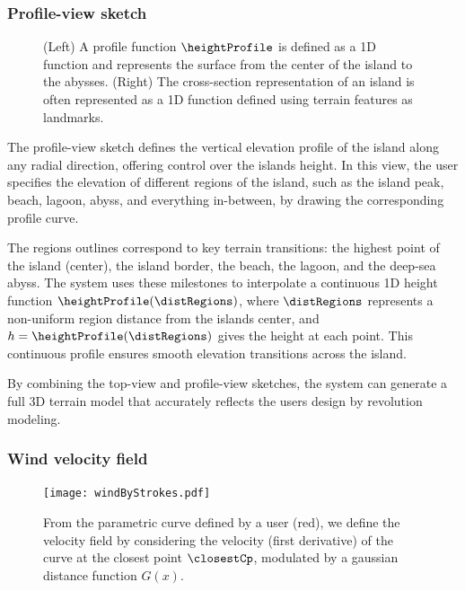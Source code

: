 \subsubsection{Profile-view sketch}

\begin{figure}[H]
	\centering
    \caption{(Left) A profile function $\heightProfile$ is defined as a 1D function and represents the surface from the center of the island to the abysses. (Right) The cross-section representation of an island is often represented as a 1D function defined using terrain features as landmarks. }
    \label{fig:coral-island_profile-function}
\end{figure}

The profile-view sketch defines the vertical elevation profile of the island along any radial direction, offering control over the islands height. In this view, the user specifies the elevation of different regions of the island, such as the island peak, beach, lagoon, abyss, and everything in-between, by drawing the corresponding profile curve.

The regions outlines correspond to key terrain transitions: the highest point of the island (center), the island border, the beach, the lagoon, and the deep-sea abyss. The system uses these milestones to interpolate a continuous 1D height function $\heightProfile(\distRegions)$, where $\distRegions$ represents a non-uniform region distance from the islands center, and $h = \heightProfile(\distRegions)$ gives the height at each point. This continuous profile ensures smooth elevation transitions across the island.

By combining the top-view and profile-view sketches, the system can generate a full 3D terrain model that accurately reflects the users design by revolution modeling.

\subsubsection{Wind velocity field}

\begin{figure}[ht]
    \centering
    \texttt{[image: windByStrokes.pdf]}
    \caption{From the parametric curve defined by a user (red), we define the velocity field by considering the velocity (first derivative) of the curve at the closest point $\closestCp$, modulated by a gaussian distance function $G(x)$. }
    \label{fig:coral-island_wind-from-strokes}
\end{figure}

